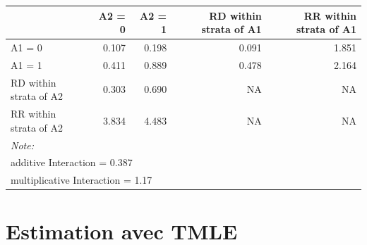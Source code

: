 \documentclass[
]{book}
\begin{document}
\begin{table}
\centering
\begin{tabular}[t]{l|r|r|r|r}
\hline
  & A2 = 0 & A2 = 1 & RD within strata of A1 & RR within strata of A1\\
\hline
A1 = 0 & 0.107 & 0.198 & 0.091 & 1.851\\
\hline
A1 = 1 & 0.411 & 0.889 & 0.478 & 2.164\\
\hline
RD within strata of A2 & 0.303 & 0.690 & NA & NA\\
\hline
RR within strata of A2 & 3.834 & 4.483 & NA & NA\\
\hline
\multicolumn{5}{l}{\rule{0pt}{1em}\textit{Note: }}\\
\multicolumn{5}{l}{\rule{0pt}{1em}additive Interaction = 0.387}\\
\multicolumn{5}{l}{\rule{0pt}{1em}multiplicative Interaction = 1.17}\\
\end{tabular}
\end{table}

\hypertarget{estimation-avec-tmle}{%
\section{Estimation avec TMLE}\label{estimation-avec-tmle}}
\end{document}
